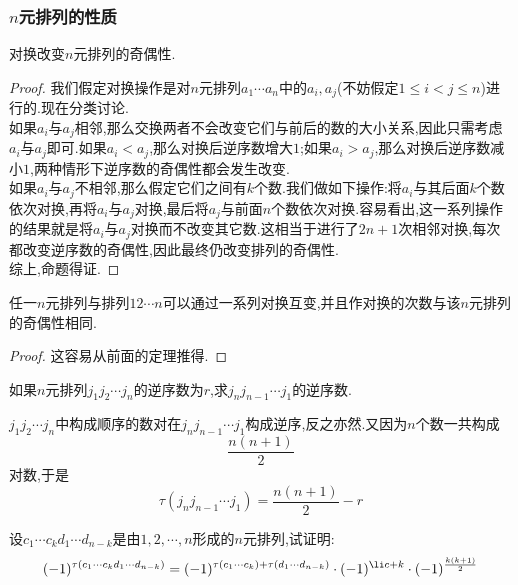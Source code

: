 \documentclass{ctexart}
\begin{document}
\subsubsection{$n$元排列的性质}
\begin{theorem}[对换操作的特性]
    对换改变$n$元排列的奇偶性.
\end{theorem}
\begin{proof}
    我们假定对换操作是对$n$元排列$a_1\cdots a_n$中的$a_i,a_j$(不妨假定$1\leqslant i<j\leqslant n$)进行的.现在分类讨论.\\
    \indent 如果$a_i$与$a_j$相邻,那么交换两者不会改变它们与前后的数的大小关系,因此只需考虑$a_i$与$a_j$即可.如果$a_i<a_j$,那么对换后逆序数增大$1$;如果$a_i>a_j$,那么对换后逆序数减小$1$,两种情形下逆序数的奇偶性都会发生改变.\\
    \indent 如果$a_i$与$a_j$不相邻,那么假定它们之间有$k$个数.我们做如下操作:将$a_i$与其后面$k$个数依次对换,再将$a_i$与$a_j$对换,最后将$a_j$与前面$n$个数依次对换.容易看出,这一系列操作的结果就是将$a_i$与$a_j$对换而不改变其它数.这相当于进行了$2n+1$次相邻对换,每次都改变逆序数的奇偶性,因此最终仍改变排列的奇偶性.\\
    \indent 综上,命题得证.
\end{proof}
\begin{theorem}
    任一$n$元排列与排列$12\cdots n$可以通过一系列对换互变,并且作对换的次数与该$n$元排列的奇偶性相同.
\end{theorem}
\begin{proof}
    这容易从前面的定理推得.
\end{proof}
\begin{problem}
    如果$n$元排列$j_1j_2\cdots j_n$的逆序数为$r$,求$j_{n}j_{n-1}\cdots j_1$的逆序数.
\end{problem}
\begin{solution}
    $j_1j_2\cdots j_n$中构成顺序的数对在$j_{n}j_{n-1}\cdots j_1$构成逆序,反之亦然.又因为$n$个数一共构成
    \[\dfrac{n(n+1)}{2}\]
    对数,于是
    \[\tau\left(j_{n}j_{n-1}\cdots j_1\right)=\dfrac{n(n+1)}{2}-r\]
\end{solution}
\begin{problem}
    设$c_1\cdots c_kd_1\cdots d_{n-k}$是由$1,2,\cdots,n$形成的$n$元排列,试证明:
    \[(-1)^{\tau\left(c_1\cdots c_kd_1\cdots d_{n-k}\right)}=(-1)^{\tau\left(c_1\cdots c_k\right)+\tau\left(d_1\cdots d_{n-k}\right)}\cdot(-1)^{\li c+k}\cdot(-1)^{\frac{k(k+1)}{2}}\]
\end{problem}
\end{document}
